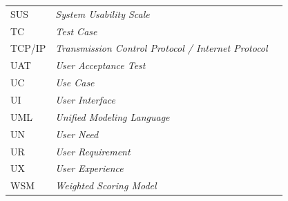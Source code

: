 \begin{longtable}{@{} l >{\raggedright\arraybackslash}p{9cm} l @{}}
SUS     & \textit{System Usability Scale}                               & \pageref{chap:evaluasi}          \\
TC      & \textit{Test Case}                                            & \pageref{chap:evaluasi}          \\
TCP/IP  & \textit{Transmission Control Protocol / Internet Protocol}    & \pageref{chap:perancangan}       \\
UAT     & \textit{User Acceptance Test}                                 & \pageref{chap:evaluasi}          \\
UC      & \textit{Use Case}                                             & \pageref{chap:perancangan}       \\
UI      & \textit{User Interface}                                       & \pageref{chap:perancangan}       \\
UML     & \textit{Unified Modeling Language}                            & \pageref{chap:pendahuluan}       \\
UN      & \textit{User Need}                                            & \pageref{chap:studi-literatur}   \\
UR      & \textit{User Requirement}                                     & \pageref{chap:studi-literatur}   \\
UX      & \textit{User Experience}                                      & \pageref{chap:perancangan}       \\
WSM     & \textit{Weighted Scoring Model}                               & \pageref{chap:studi-literatur}   \\

\end{longtable}
